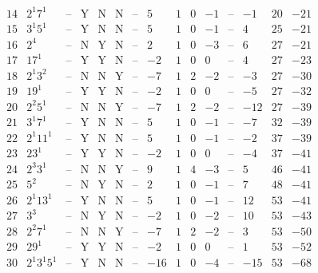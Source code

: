 \documentclass[11pt,reqno,a4letter]{article}
\numberwithin{figure}{section}
\numberwithin{table}{section}
\theoremstyle{plain}
\numberwithin{theorem}{section}
\theoremstyle{definition}
\begin{document}
\begin{table}[h!]
\begin{equation*}
{\begin{array}{|cc|c|ccc|c|c|ccc|c|ccc}
 14 & 2^1 7^1 & \text{--} & \text{Y} & \text{N} & \text{N} & \text{--} & 5 & 1 & 0 & -1 & \text{--} & -1 & 20 & -21 \\
 15 & 3^1 5^1 & \text{--} & \text{Y} & \text{N} & \text{N} & \text{--} & 5 & 1 & 0 & -1 & \text{--} & 4 & 25 & -21 \\
 16 & 2^4 & \text{--} & \text{N} & \text{Y} & \text{N} & \text{--} & 2 & 1 & 0 & -3 & \text{--} & 6 & 27 & -21 \\
 17 & 17^1 & \text{--} & \text{Y} & \text{Y} & \text{N} & \text{--} & -2 & 1 & 0 & 0 & \text{--} & 4 & 27 & -23 \\
 18 & 2^1 3^2 & \text{--} & \text{N} & \text{N} & \text{Y} & \text{--} & -7 & 1 & 2 & -2 & \text{--} & -3 & 27 & -30 \\
 19 & 19^1 & \text{--} & \text{Y} & \text{Y} & \text{N} & \text{--} & -2 & 1 & 0 & 0 & \text{--} & -5 & 27 & -32 \\
 20 & 2^2 5^1 & \text{--} & \text{N} & \text{N} & \text{Y} & \text{--} & -7 & 1 & 2 & -2 & \text{--} & -12 & 27 & -39 \\
 21 & 3^1 7^1 & \text{--} & \text{Y} & \text{N} & \text{N} & \text{--} & 5 & 1 & 0 & -1 & \text{--} & -7 & 32 & -39 \\
 22 & 2^1 11^1 & \text{--} & \text{Y} & \text{N} & \text{N} & \text{--} & 5 & 1 & 0 & -1 & \text{--} & -2 & 37 & -39 \\
 23 & 23^1 & \text{--} & \text{Y} & \text{Y} & \text{N} & \text{--} & -2 & 1 & 0 & 0 & \text{--} & -4 & 37 & -41 \\
 24 & 2^3 3^1 & \text{--} & \text{N} & \text{N} & \text{Y} & \text{--} & 9 & 1 & 4 & -3 & \text{--} & 5 & 46 & -41 \\
 25 & 5^2 & \text{--} & \text{N} & \text{Y} & \text{N} & \text{--} & 2 & 1 & 0 & -1 & \text{--} & 7 & 48 & -41 \\
 26 & 2^1 13^1 & \text{--} & \text{Y} & \text{N} & \text{N} & \text{--} & 5 & 1 & 0 & -1 & \text{--} & 12 & 53 & -41 \\
 27 & 3^3 & \text{--} & \text{N} & \text{Y} & \text{N} & \text{--} & -2 & 1 & 0 & -2 & \text{--} & 10 & 53 & -43 \\
 28 & 2^2 7^1 & \text{--} & \text{N} & \text{N} & \text{Y} & \text{--} & -7 & 1 & 2 & -2 & \text{--} & 3 & 53 & -50 \\
 29 & 29^1 & \text{--} & \text{Y} & \text{Y} & \text{N} & \text{--} & -2 & 1 & 0 & 0 & \text{--} & 1 & 53 & -52 \\
 30 & 2^1 3^1 5^1 & \text{--} & \text{Y} & \text{N} & \text{N} & \text{--} & -16 & 1 & 0 & -4 & \text{--} & -15 & 53 & -68 \\

\end{array}}
\end{equation*}
\end{table}
\end{document}
